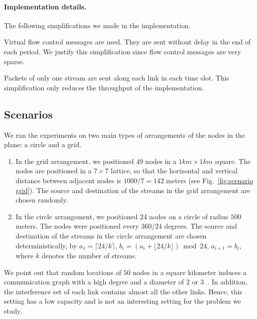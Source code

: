 \documentclass[12pt]{article}
\newenvironment{proof sketch}[1]{\noindent {\emph{Proof sketch of #1:}}}{\hfill \qed}
\begin{document}
\paragraph{Implementation details.}
The following simplifications we made in the implementation.
\begin{inparaenum}[(1)]
\item Virtual flow control messages are used. They are sent without
  delay in the end of each period. We justify this simplification
  since flow control messages are very sparse.
\item Packets of only one stream are sent along each link in each time slot.
This simplification only reduces the throughput of the implementation.
\end{inparaenum}

\subsection{Scenarios}
We ran the experiments on two main types of arrangements of the nodes
in the plane: a circle and a grid.

\begin{enumerate}
\item In the grid arrangement, we positioned $49$ nodes in a
  $1km\times 1km$ square. The nodes are positioned in a $7\times 7$
  lattice, so that the horizontal and vertical distance between
  adjacent nodes is $1000/7=142$ meters (see Fig.~\ref{fig:scenario
    grid}).    The source and destination of the streams
  in the grid arrangement are chosen randomly.

\item In the circle arrangement, we positioned $24$ nodes on a circle
  of radius $500$ meters.  The nodes were positioned every $360/24$
  degrees. %
  The source and
  destination of the streams in the circle arrangement are chosen
  deterministically, by $a_1=\lceil 24/k \rceil$, $b_i=(a_i + \lfloor
  24/k \rfloor) \bmod 24$, $a_{i+1}=b_i$, where $k$ denotes the number of streams.
\end{enumerate}

We point out that random locations of $50$ nodes in a square kilometer
induces a communication graph with a high degree and a diameter of
$2$ or $3$~\cite{marina2010topology}. In addition, the interference set of
each link contains almost all the other links. Hence, this setting has a
low capacity and is not an interesting setting for the problem we
study.
\end{document}
